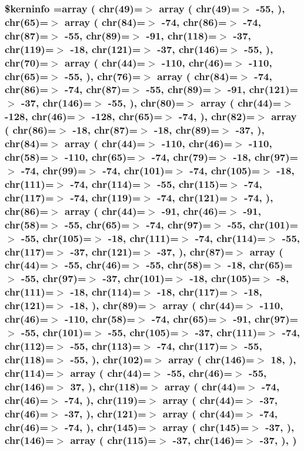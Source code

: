 \hypertarget{chelveticab_8php_ab4bb7d3b0332c517f6a42a1924f01000}{
\subsubsection[{\$kerninfo}]{\setlength{\rightskip}{0pt plus 5cm}\$kerninfo =array ( chr(49)=$>$ array ( chr(49)=$>$ -\/55, ), chr(65)=$>$ array ( chr(84)=$>$ -\/74, chr(86)=$>$ -\/74, chr(87)=$>$ -\/55, chr(89)=$>$ -\/91, chr(118)=$>$ -\/37, chr(119)=$>$ -\/18, chr(121)=$>$ -\/37, chr(146)=$>$ -\/55, ), chr(70)=$>$ array ( chr(44)=$>$ -\/110, chr(46)=$>$ -\/110, chr(65)=$>$ -\/55, ), chr(76)=$>$ array ( chr(84)=$>$ -\/74, chr(86)=$>$ -\/74, chr(87)=$>$ -\/55, chr(89)=$>$ -\/91, chr(121)=$>$ -\/37, chr(146)=$>$ -\/55, ), chr(80)=$>$ array ( chr(44)=$>$ -\/128, chr(46)=$>$ -\/128, chr(65)=$>$ -\/74, ), chr(82)=$>$ array ( chr(86)=$>$ -\/18, chr(87)=$>$ -\/18, chr(89)=$>$ -\/37, ), chr(84)=$>$ array ( chr(44)=$>$ -\/110, chr(46)=$>$ -\/110, chr(58)=$>$ -\/110, chr(65)=$>$ -\/74, chr(79)=$>$ -\/18, chr(97)=$>$ -\/74, chr(99)=$>$ -\/74, chr(101)=$>$ -\/74, chr(105)=$>$ -\/18, chr(111)=$>$ -\/74, chr(114)=$>$ -\/55, chr(115)=$>$ -\/74, chr(117)=$>$ -\/74, chr(119)=$>$ -\/74, chr(121)=$>$ -\/74, ), chr(86)=$>$ array ( chr(44)=$>$ -\/91, chr(46)=$>$ -\/91, chr(58)=$>$ -\/55, chr(65)=$>$ -\/74, chr(97)=$>$ -\/55, chr(101)=$>$ -\/55, chr(105)=$>$ -\/18, chr(111)=$>$ -\/74, chr(114)=$>$ -\/55, chr(117)=$>$ -\/37, chr(121)=$>$ -\/37, ), chr(87)=$>$ array ( chr(44)=$>$ -\/55, chr(46)=$>$ -\/55, chr(58)=$>$ -\/18, chr(65)=$>$ -\/55, chr(97)=$>$ -\/37, chr(101)=$>$ -\/18, chr(105)=$>$ -\/8, chr(111)=$>$ -\/18, chr(114)=$>$ -\/18, chr(117)=$>$ -\/18, chr(121)=$>$ -\/18, ), chr(89)=$>$ array ( chr(44)=$>$ -\/110, chr(46)=$>$ -\/110, chr(58)=$>$ -\/74, chr(65)=$>$ -\/91, chr(97)=$>$ -\/55, chr(101)=$>$ -\/55, chr(105)=$>$ -\/37, chr(111)=$>$ -\/74, chr(112)=$>$ -\/55, chr(113)=$>$ -\/74, chr(117)=$>$ -\/55, chr(118)=$>$ -\/55, ), chr(102)=$>$ array ( chr(146)=$>$ 18, ), chr(114)=$>$ array ( chr(44)=$>$ -\/55, chr(46)=$>$ -\/55, chr(146)=$>$ 37, ), chr(118)=$>$ array ( chr(44)=$>$ -\/74, chr(46)=$>$ -\/74, ), chr(119)=$>$ array ( chr(44)=$>$ -\/37, chr(46)=$>$ -\/37, ), chr(121)=$>$ array ( chr(44)=$>$ -\/74, chr(46)=$>$ -\/74, ), chr(145)=$>$ array ( chr(145)=$>$ -\/37, ), chr(146)=$>$ array ( chr(115)=$>$ -\/37, chr(146)=$>$ -\/37, ), )}}\label{chelveticab_8php_ab4bb7d3b0332c517f6a42a1924f01000}


